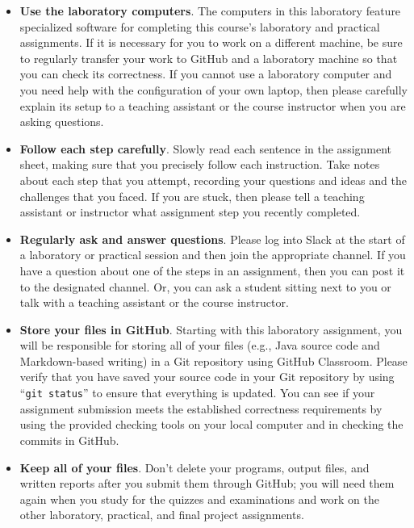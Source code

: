 \documentclass[11pt]{article}
\newcommand{\command}[1]{``\lstinline{#1}''}
\begin{document}
\begin{itemize}
  \setlength{\itemsep}{0pt}

\item {\bf Use the laboratory computers}. The computers in this laboratory
  feature specialized software for completing this course's laboratory and
  practical assignments. If it is necessary for you to work on a different
  machine, be sure to regularly transfer your work to GitHub and a laboratory
  machine so that you can check its correctness. If you cannot use a laboratory
  computer and you need help with the configuration of your own laptop, then
  please carefully explain its setup to a teaching assistant or the course
  instructor when you are asking questions.

\item {\bf Follow each step carefully}. Slowly read each sentence in the
  assignment sheet, making sure that you precisely follow each instruction. Take
  notes about each step that you attempt, recording your questions and ideas and
  the challenges that you faced. If you are stuck, then please tell a teaching
  assistant or instructor what assignment step you recently completed.

\item {\bf Regularly ask and answer questions}. Please log into Slack at the
  start of a laboratory or practical session and then join the appropriate
  channel. If you have a question about one of the steps in an assignment, then
  you can post it to the designated channel. Or, you can ask a student sitting
  next to you or talk with a teaching assistant or the course instructor.

\item {\bf Store your files in GitHub}. Starting with this laboratory
  assignment, you will be responsible for storing all of your files (e.g., Java
  source code and Markdown-based writing) in a Git repository using GitHub
  Classroom. Please verify that you have saved your source code in your Git
  repository by using \command{git status} to ensure that everything is updated.
  You can see if your assignment submission meets the established correctness
  requirements by using the provided checking tools on your local computer and
  in checking the commits in GitHub.

\item {\bf Keep all of your files}. Don't delete your programs, output files,
  and written reports after you submit them through GitHub; you will need them
  again when you study for the quizzes and examinations and work on the other
  laboratory, practical, and final project assignments.


\end{itemize}
\end{document}
